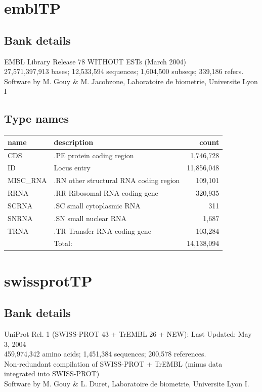 \documentclass{article}
\begin{document}
\begin{Schunk}
\section{ emblTP }
\subsection{Bank details}
EMBL Library Release 78 WITHOUT ESTs  (March 2004)\\
27,571,397,913 bases; 12,533,594 sequences; 1,604,500 subseqs; 339,186 refers.\\
Software by M. Gouy \& M. Jacobzone, Laboratoire de biometrie, Universite Lyon I

\subsection{Type names}
\noindent\begin{tabular}{llr}
\hline \hline
name & description & count \\
\hline
CDS  &  .PE protein coding region  &  1,746,728 \\
ID  &  Locus entry  &  11,856,048 \\
MISC\_RNA  &  .RN other structural RNA coding region  &  109,101 \\
RRNA  &  .RR Ribosomal RNA coding gene  &  320,935 \\
SCRNA  &  .SC small cytoplasmic RNA  &  311 \\
SNRNA  &  .SN small nuclear RNA  &  1,687 \\
TRNA  &  .TR Transfer RNA coding gene  &  103,284 \\
\hline
 & Total: & 14,138,094 \\
\hline \hline
\end{tabular}

\section{ swissprotTP }
\subsection{Bank details}
UniProt Rel. 1 (SWISS-PROT 43 + TrEMBL 26 + NEW): Last Updated: May  3, 2004\\
459,974,342 amino acids; 1,451,384 sequences; 200,578 references.\\
Non-redundant compilation of SWISS-PROT + TrEMBL (minus  data\\
integrated  into  SWISS-PROT)\\
Software by M. Gouy \& L. Duret, Laboratoire de biometrie, Universite Lyon I.


\end{Schunk}
\end{document}
